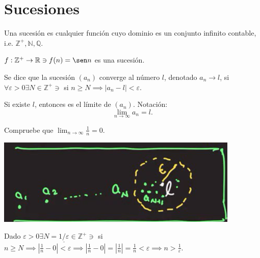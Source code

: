 \section{Sucesiones}

\begin{definicion}
	Una sucesión es cualquier función cuyo dominio es un conjunto infinito contable, i.e. $\mathbb{Z}^+, \mathbb{N},\mathbb{Q}$. 
\end{definicion}

\begin{ejemplo}
	$f:\mathbb{Z}^+\to\mathbb{R}\ni f(n)=\sen n$ es una sucesión. 
\end{ejemplo}

\begin{definicion}
	Se dice que la sucesión $(a_n)$ converge al número $l$, denotado $a_n\to l$, si $\forall \varepsilon >0\exists N\in\mathbb{Z}^+\ni$ si $n\geq N\implies |a_n-l|<\varepsilon$. 
\end{definicion}
\begin{nota}
	Si existe $l$, entonces es el límite de $(a_n)$. Notación: $$\lim_{n\to\infty} a_n=l.$$
\end{nota}

\begin{ejemplo}
	Compruebe que $\lim_{n\to\infty}\frac{1}{n}=0$. 
	\begin{center}
		\includegraphics[scale=0.4]{images/4/1}
	\end{center}
\end{ejemplo}
\begin{sol}
	Dado $\varepsilon>0\exists N=\underline{1/\varepsilon}\in \mathbb{Z}^+\ni $ si $n\geq N\implies \left|\frac{1}{n}-0\right|<\varepsilon\implies \left|\frac{1}{n}-0\right|=\left|\frac{1}{n}\right|=\frac{1}{n}<\varepsilon\implies n>\frac{1}{\varepsilon}$.
\end{sol}

